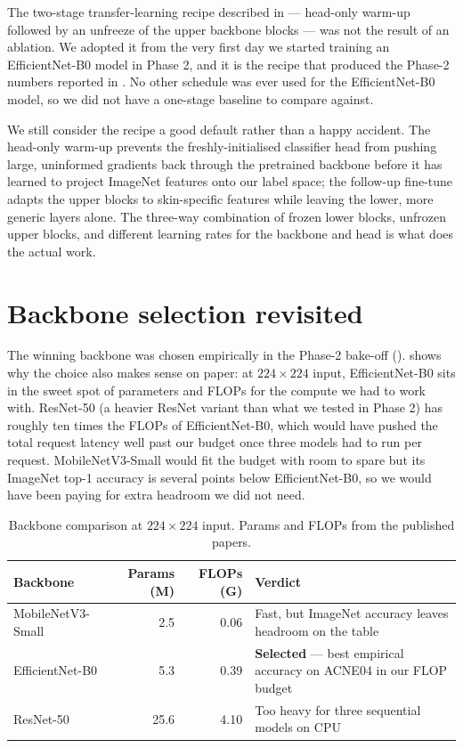 \documentclass[11pt,a4paper,oneside]{report}
\newcommand{\effnet}{EfficientNet-B0\xspace}
\begin{document}
The two-stage transfer-learning recipe described in
 --- head-only warm-up followed by an unfreeze
of the upper backbone blocks --- was not the result of an ablation.
We adopted it from the very first day we started training an
\effnet model in Phase 2, and it is the recipe that produced the
Phase-2 numbers reported in . No other
schedule was ever used for the \effnet model, so we did not have a
one-stage baseline to compare against.

We still consider the recipe a good default rather than a happy
accident. The head-only warm-up prevents the freshly-initialised
classifier head from pushing large, uninformed gradients back
through the pretrained backbone before it has learned to project
ImageNet features onto our label space; the follow-up fine-tune
adapts the upper blocks to skin-specific features while leaving
the lower, more generic layers alone. The three-way combination of
frozen lower blocks, unfrozen upper blocks, and different learning
rates for the backbone and head is what does the actual work.

\section{Backbone selection revisited}

The winning backbone was chosen empirically in the Phase-2 bake-off
().  shows why the choice
also makes sense on paper: at \(224\times 224\) input, \effnet sits
in the sweet spot of parameters and FLOPs for the compute we had
to work with. ResNet-50 (a heavier ResNet variant than what we tested
in Phase 2) has roughly ten times the FLOPs of \effnet, which would
have pushed the total request latency well past our budget once
three models had to run per request. MobileNetV3-Small would fit
the budget with room to spare but its ImageNet top-1 accuracy is
several points below \effnet, so we would have been paying for
extra headroom we did not need.

\begin{table}[htbp]
    \centering
    \caption{Backbone comparison at \(224\times 224\) input.
    Params and FLOPs from the published papers.}
    \label{tab:backbones}
    \small
    \begin{tabularx}{\linewidth}{lrrX}
        \toprule
        \textbf{Backbone} & \textbf{Params (M)} & \textbf{FLOPs (G)} & \textbf{Verdict} \\
        \midrule
        MobileNetV3-Small & 2.5  & 0.06 & Fast, but ImageNet accuracy leaves headroom on the table \\
        \effnet           & 5.3  & 0.39 & \textbf{Selected} --- best empirical accuracy on ACNE04 in our FLOP budget \\
        ResNet-50         & 25.6 & 4.10 & Too heavy for three sequential models on CPU \\
        \bottomrule
    \end{tabularx}
\end{table}
\end{document}
